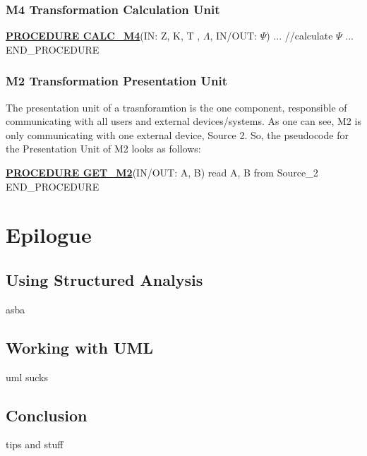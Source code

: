\documentclass{article}
\begin{document}
\subsubsection{M4 Transformation Calculation Unit}
\begin{algorithmic}[H]
\STATE \underline{\textbf{PROCEDURE CALC\_M4}}(IN: Z, K, T , $\Lambda$, IN/OUT: $\Psi$)
	\STATE ...
	\STATE //calculate $\Psi$
	\STATE ...
\STATE END\_PROCEDURE
\end{algorithmic}

\subsubsection{M2 Transformation Presentation Unit}
The presentation unit of a trasnforamtion is the one component, responsible of communicating with all users
and external devices/systems. As one can see, M2 is only communicating with one external device, Source 2.
So, the pseudocode for the Presentation Unit of M2 looks as follows:
\begin{algorithmic}[H]
\STATE \underline{\textbf{PROCEDURE GET\_M2}}(IN/OUT: A, B)
	\STATE read A, B from Source\_2
\STATE END\_PROCEDURE
\end{algorithmic}



\section{Epilogue}

\subsection{Using Structured Analysis}  
asba

\subsection{Working with UML}
uml sucks

\subsection{Conclusion}
tips and stuff
   
\end{document}

